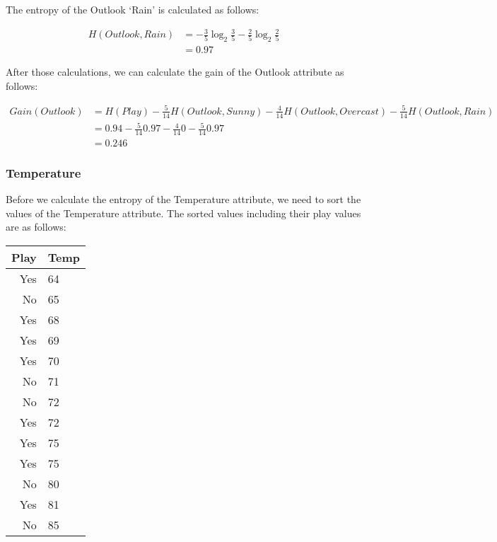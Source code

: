 \documentclass[
  11pt, %
]{assignment}
\begin{document}
The entropy of the Outlook `Rain' is calculated as follows:

\begin{equation}
	\label{eq:entropy-outlook-rain}
	\begin{split}
		H(Outlook, Rain) &= -\frac{3}{5} \log_2 \frac{3}{5} - \frac{2}{5} \log_2 \frac{2}{5} \\
		&= 0.97
	\end{split}
\end{equation}

After those calculations, we can calculate the gain of the Outlook attribute as follows:

\begin{equation}
	\label{eq:gain-outlook}
	\begin{split}
		Gain(Outlook) &= H(Play) - \frac{5}{14} H(Outlook, Sunny) - \frac{4}{14} H(Outlook, Overcast) - \frac{5}{14} H(Outlook, Rain) \\
		&= 0.94 - \frac{5}{14} 0.97 - \frac{4}{14} 0 - \frac{5}{14} 0.97 \\
		&= 0.246
	\end{split}
\end{equation}

\subsubsection*{Temperature}

Before we calculate the entropy of the Temperature attribute, we need to sort the values of the Temperature attribute. The sorted values including their play values are as follows:

\begin{center}
	\begin{tabular}{r l}
		Play & Temp \\
		\toprule
		Yes  & 64   \\
		No   & 65   \\
		Yes  & 68   \\
		Yes  & 69   \\
		Yes  & 70   \\
		No   & 71   \\
		No   & 72   \\
		Yes  & 72   \\
		Yes  & 75   \\
		Yes  & 75   \\
		No   & 80   \\
		Yes  & 81   \\
		No   & 85   \\
		\bottomrule
	\end{tabular}
\end{center}
\end{document}
